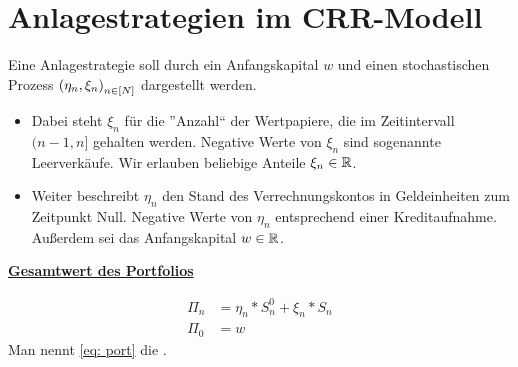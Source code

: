 \section{Anlagestrategien im CRR-Modell}

Eine Anlagestrategie soll durch ein Anfangskapital $w$ und einen stochastischen Prozess $\left( \eta_n, \xi_n \right)_{n \in [N]}$ dargestellt werden. 
\begin{itemize}
	\item Dabei steht $\xi_n$ für die ''Anzahl`` der Wertpapiere, die im Zeitintervall $(n-1,n]$ gehalten werden. Negative Werte von $\xi_n$ sind sogenannte Leerverkäufe. Wir erlauben beliebige Anteile $\xi_n \in \mathbb{R}$.
	\item Weiter beschreibt $\eta_n$ den Stand des Verrechnungskontos in Geldeinheiten zum Zeitpunkt Null. Negative Werte von $\eta_n$ entsprechend einer Kreditaufnahme.
	Außerdem sei das Anfangskapital $w \in \mathbb{R}$.
\end{itemize}

\textbf{\underline{Gesamtwert des Portfolios}}

\begin{equation*}
\begin{aligned}
\Pi_n &= \eta_n * S_n^0 + \xi_n * S_n \\
\Pi_0 &= w
\end{aligned} \tag{Port} \label{eq: port}
\end{equation*}
Man nennt \eqref{eq: port} die .

